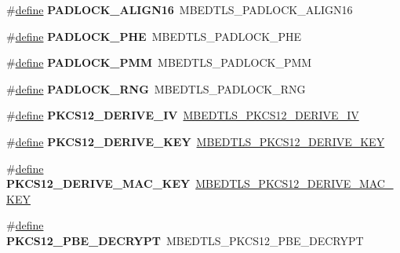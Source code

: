 \begin{DoxyCompactItemize}
\#\hyperlink{structdefine}{define} {\bfseries P\+A\+D\+L\+O\+C\+K\+\_\+\+A\+L\+I\+G\+N16}~M\+B\+E\+D\+T\+L\+S\+\_\+\+P\+A\+D\+L\+O\+C\+K\+\_\+\+A\+L\+I\+G\+N16
\item 
\mbox{\label{compat-1_83_8h_aa4857031bf1a0df4f2c8ec160ed7532f}} 
\#\hyperlink{structdefine}{define} {\bfseries P\+A\+D\+L\+O\+C\+K\+\_\+\+P\+HE}~M\+B\+E\+D\+T\+L\+S\+\_\+\+P\+A\+D\+L\+O\+C\+K\+\_\+\+P\+HE
\item 
\mbox{\label{compat-1_83_8h_a22968b34e8f6b8b095f0a5d5aa7e1df5}} 
\#\hyperlink{structdefine}{define} {\bfseries P\+A\+D\+L\+O\+C\+K\+\_\+\+P\+MM}~M\+B\+E\+D\+T\+L\+S\+\_\+\+P\+A\+D\+L\+O\+C\+K\+\_\+\+P\+MM
\item 
\mbox{\label{compat-1_83_8h_a3eb797ca24be7c69bbce6a6c37e094d8}} 
\#\hyperlink{structdefine}{define} {\bfseries P\+A\+D\+L\+O\+C\+K\+\_\+\+R\+NG}~M\+B\+E\+D\+T\+L\+S\+\_\+\+P\+A\+D\+L\+O\+C\+K\+\_\+\+R\+NG
\item 
\mbox{\label{compat-1_83_8h_ab7eb878060cdcbaf9ef6722a1b8eb955}} 
\#\hyperlink{structdefine}{define} {\bfseries P\+K\+C\+S12\+\_\+\+D\+E\+R\+I\+V\+E\+\_\+\+IV}~\hyperlink{pkcs12_8h_ad8ac9a220c8d237a9a5bc972daed1c13}{M\+B\+E\+D\+T\+L\+S\+\_\+\+P\+K\+C\+S12\+\_\+\+D\+E\+R\+I\+V\+E\+\_\+\+IV}
\item 
\mbox{\label{compat-1_83_8h_a0097fb65a04f5e2084cfd3adf89a82e1}} 
\#\hyperlink{structdefine}{define} {\bfseries P\+K\+C\+S12\+\_\+\+D\+E\+R\+I\+V\+E\+\_\+\+K\+EY}~\hyperlink{pkcs12_8h_ad9b0f41c74cd6a8e072c84b5d310b331}{M\+B\+E\+D\+T\+L\+S\+\_\+\+P\+K\+C\+S12\+\_\+\+D\+E\+R\+I\+V\+E\+\_\+\+K\+EY}
\item 
\mbox{\label{compat-1_83_8h_a63fe520ec518c16960a42ee4819f3977}} 
\#\hyperlink{structdefine}{define} {\bfseries P\+K\+C\+S12\+\_\+\+D\+E\+R\+I\+V\+E\+\_\+\+M\+A\+C\+\_\+\+K\+EY}~\hyperlink{pkcs12_8h_a91d3d19fb1a5cd18648f363eff8617ec}{M\+B\+E\+D\+T\+L\+S\+\_\+\+P\+K\+C\+S12\+\_\+\+D\+E\+R\+I\+V\+E\+\_\+\+M\+A\+C\+\_\+\+K\+EY}
\item 
\mbox{\label{compat-1_83_8h_a5b444102c7edd3a54436645d52706498}} 
\#\hyperlink{structdefine}{define} {\bfseries P\+K\+C\+S12\+\_\+\+P\+B\+E\+\_\+\+D\+E\+C\+R\+Y\+PT}~M\+B\+E\+D\+T\+L\+S\+\_\+\+P\+K\+C\+S12\+\_\+\+P\+B\+E\+\_\+\+D\+E\+C\+R\+Y\+PT

\end{DoxyCompactItemize}
